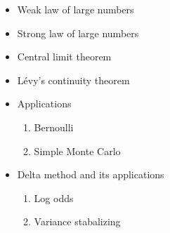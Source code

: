 \begin{itemize}
    \item Weak law of large numbers
    \item Strong law of large numbers
    \item Central limit theorem
    \item Lévy's continuity theorem
    \item Applications
        \begin{enumerate}
            \item Bernoulli
            \item Simple Monte Carlo
        \end{enumerate}
    \item Delta method and its applications
        \begin{enumerate}
            \item Log odds
            \item Variance stabalizing
        \end{enumerate}
\end{itemize}